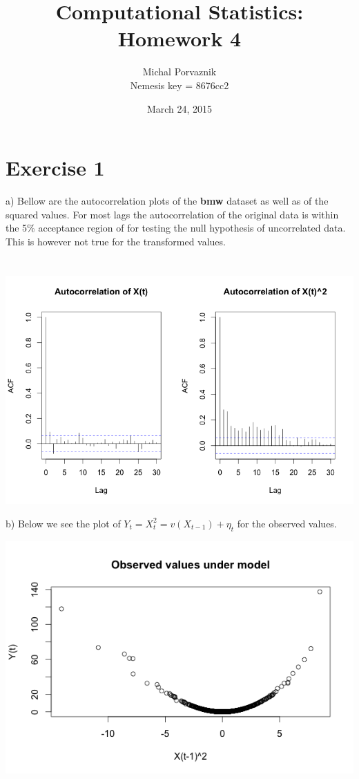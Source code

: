 \documentclass[a4paper,12pt]{article}
\begin{document}
\title{\textbf{Computational Statistics: Homework 4}}
\author{Michal Porvaznik \\ Nemesis key = 8676cc2}
\date{March 24, 2015}
\maketitle
%
\section*{Exercise 1}
%
a) Bellow are the autocorrelation plots of the \textbf{bmw} dataset as well as of the squared values. For most lags the autocorrelation of the original data is within the 5\% acceptance region of for testing the null hypothesis of uncorrelated data. This is however not true for the transformed values.
\\
\\
\\
\includegraphics[scale = 0.55]{hmw4_plot1.png}
\pagebreak

b) Below we see the plot of $Y_t = X_t^2 =  v(X_{t-1}) + \eta_t$ for the observed values.

\includegraphics[scale = 0.65]{hmw4_plot11.png}
\end{document}
